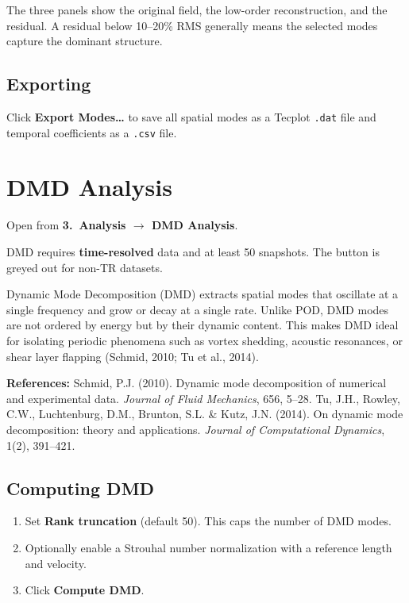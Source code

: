 \documentclass[11pt, a4paper]{report}
\newcommand{\uipth}[1]{\textbf{\textcolor{upblue}{#1}}}
\begin{document}
The three panels show the original field, the low-order reconstruction, and the residual. A residual below 10--20\% RMS generally means the selected modes capture the dominant structure.

\section{Exporting}

Click \uipth{Export Modes\ldots} to save all spatial modes as a Tecplot \texttt{.dat} file and temporal coefficients as a \texttt{.csv} file.

\chapter{DMD Analysis}
\label{ch:dmd}

Open from \uipth{3.\ Analysis $\to$ DMD Analysis}.

\begin{notebox}
DMD requires \textbf{time-resolved} data and at least 50 snapshots. The button is greyed out for non-TR datasets.
\end{notebox}

Dynamic Mode Decomposition (DMD) extracts spatial modes that oscillate at a single frequency and grow or decay at a single rate. Unlike POD, DMD modes are not ordered by energy but by their dynamic content. This makes DMD ideal for isolating periodic phenomena such as vortex shedding, acoustic resonances, or shear layer flapping (Schmid, 2010; Tu et al., 2014).

\noindent\textbf{References:} Schmid, P.J. (2010). Dynamic mode decomposition of numerical and experimental data. \textit{Journal of Fluid Mechanics}, 656, 5--28. Tu, J.H., Rowley, C.W., Luchtenburg, D.M., Brunton, S.L. \& Kutz, J.N. (2014). On dynamic mode decomposition: theory and applications. \textit{Journal of Computational Dynamics}, 1(2), 391--421.

\section{Computing DMD}

\begin{stepbox}
\begin{enumerate}[leftmargin=1.5em, topsep=2pt]
  \item Set \uipth{Rank truncation} (default 50). This caps the number of DMD modes.
  \item Optionally enable a Strouhal number normalization with a reference length and velocity.
  \item Click \uipth{Compute DMD}.
\end{enumerate}
\end{stepbox}
\end{document}
